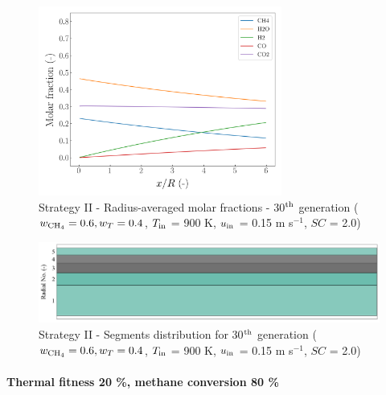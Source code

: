 \documentclass[preprint,12pt]{elsarticle}
\begin{document}
\begin{figure}[h!]
\centering
\includegraphics[width=80mm]{results/5Eq/60C_40T/GEN30-AVG.png}
\caption{\label{fig:5RES6040G30-avg} Strategy II - Radius-averaged molar fractions -  30$^{\rm{th}}$ generation ($w_{\rm{CH_4}} = 0.6, w_T = 0.4$, $T_{\rm{in}}$ = 900 K, $u_{\rm{in}}$ = 0.15 m s$^{-1}$, $SC$ = 2.0)}
\end{figure}

\begin{figure}[h!]
\centering
\includegraphics[width=120mm]{results/segments/5segEq/60C40T/seg.png}
\caption{\label{fig:30L6040G1-TField} Strategy II - Segments distribution for 30$^{\rm{th}}$ generation ($w_{\rm{CH_4}} = 0.6, w_T = 0.4$, $T_{\rm{in}}$ = 900 K, $u_{\rm{in}}$ = 0.15 m s$^{-1}$, $SC$ = 2.0)}
\end{figure}


\clearpage


\paragraph{Thermal fitness 20 \%, methane conversion 80 \%} \hspace{0pt} \\
\noindent 
\end{document}
